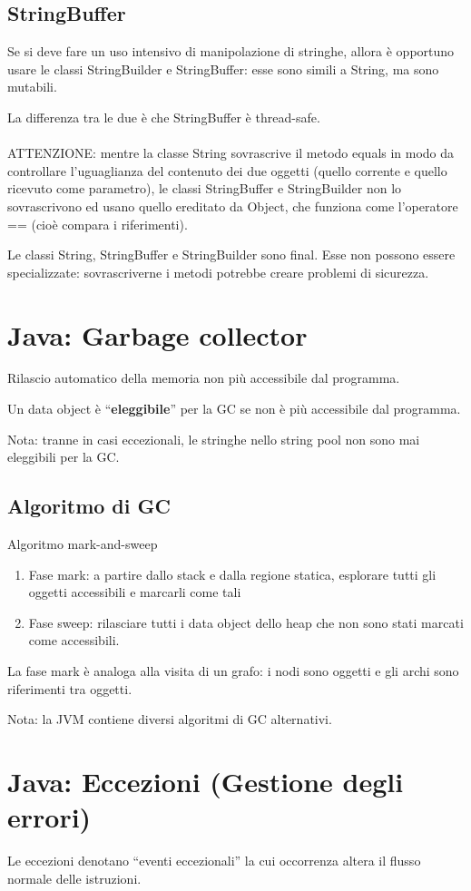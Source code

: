 \documentclass[10pt]{article}
\begin{document}
\subsection{StringBuffer}
Se si deve fare un uso intensivo di manipolazione di stringhe,
allora è opportuno usare le classi StringBuilder e StringBuffer: esse sono simili a String, ma sono mutabili.

La differenza tra le due è che StringBuffer è thread-safe.\\\\
ATTENZIONE: mentre la classe String sovrascrive il metodo
equals in modo da controllare l’uguaglianza del contenuto dei
due oggetti (quello corrente e quello ricevuto come parametro), le
classi StringBuffer e StringBuilder non lo sovrascrivono ed
usano quello ereditato da Object, che funziona come l’operatore
== (cioè compara i riferimenti).

Le classi String, StringBuffer e StringBuilder sono final.
Esse non possono essere specializzate: sovrascriverne i metodi
potrebbe creare problemi di sicurezza.
\section{Java: Garbage collector}
Rilascio automatico della memoria non più accessibile dal
programma.

Un data object è “\textbf{eleggibile}” per la GC se non è più accessibile dal programma.

Nota: tranne in casi eccezionali, le stringhe nello string pool non sono
mai eleggibili per la GC.
\subsection{Algoritmo di GC}
Algoritmo mark-and-sweep
\begin{enumerate}
    \item Fase mark: a partire dallo stack e dalla regione statica, esplorare
    tutti gli oggetti accessibili e marcarli come tali
\item Fase sweep: rilasciare tutti i data object dello heap che non sono
    stati marcati come accessibili.
\end{enumerate}
La fase mark è analoga alla visita di un grafo: i nodi sono oggetti e
gli archi sono riferimenti tra oggetti.

Nota: la JVM contiene diversi algoritmi di GC alternativi.
\section{Java: Eccezioni (Gestione degli errori)}
Le eccezioni denotano “eventi eccezionali” la cui occorrenza
altera il flusso normale delle istruzioni.
\end{document}
